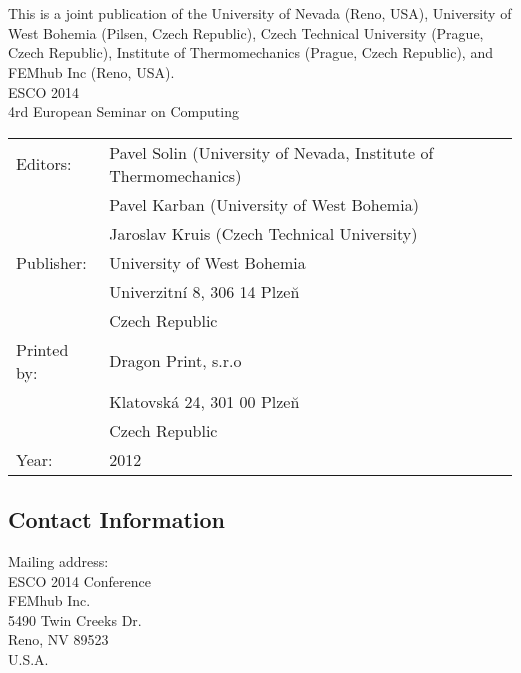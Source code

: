 \documentclass[article,A4,11pt]{llncs}%
\newcommand\BackgroundPic{
\put(0,0){
\parbox[b][\paperheight]{\paperwidth}{%
\vfill
\centering
\vfill
}}}
\begin{document}

\vbox{}
\pagestyle{empty}

\newpage

\textwidth=15.5cm


\newpage

\section*{}%

\vspace*{60mm}
This is a joint publication of the University of Nevada (Reno, USA),
University of West Bohemia (Pilsen, Czech Republic),
Czech Technical University (Prague, Czech Republic),
Institute of Thermomechanics (Prague, Czech Republic), and
FEMhub Inc (Reno, USA).\\

\noindent
ESCO 2014 \\
4rd European Seminar on Computing\\

\noindent
\begin{tabular}{ll}
Editors: & Pavel Solin (University of Nevada, Institute of Thermomechanics) \\
 & Pavel Karban (University of West Bohemia) \\
 & Jaroslav Kruis (Czech Technical University) \\
Publisher: & University of West Bohemia \\
 & Univerzitn\'{i} 8, 306 14 Plze\u{n}\\
 & Czech Republic\\
Printed by: & Dragon Print, s.r.o \\
 & Klatovsk\'{a} 24, 301 00 Plze\u{n}\\
 & Czech Republic\\
Year: & 2012\\
\end{tabular}

\subsection*{Contact Information}

Mailing address:\\
ESCO 2014 Conference\\
FEMhub Inc.\\
5490 Twin Creeks Dr.\\
Reno, NV 89523\\
U.S.A.
\end{document}
